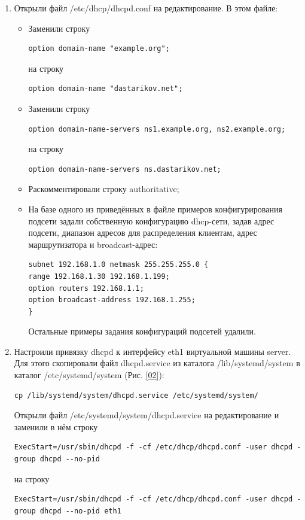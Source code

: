 \begin{enumerate}
\item Открыли файл /etc/dhcp/dhcpd.conf на редактирование. В этом файле:
    \begin{itemize}
\item Заменили строку
    \begin{verbatim}
option domain-name "example.org";
    \end{verbatim}
на строку
    \begin{verbatim}
option domain-name "dastarikov.net";
    \end{verbatim}
\item Заменили строку
    \begin{verbatim}
option domain-name-servers ns1.example.org, ns2.example.org;
    \end{verbatim}
на строку
    \begin{verbatim}
option domain-name-servers ns.dastarikov.net;
    \end{verbatim}
\item Раскомментировали строку authoritative;
\item На базе одного из приведённых в файле примеров конфигурирования подсети задали собственную конфигурацию dhcp-сети, задав адрес подсети, диапазон адресов для распределения клиентам, адрес маршрутизатора и broadcast-адрес:
    \begin{verbatim}
subnet 192.168.1.0 netmask 255.255.255.0 {
range 192.168.1.30 192.168.1.199;
option routers 192.168.1.1;
option broadcast-address 192.168.1.255;
}
    \end{verbatim}
Остальные примеры задания конфигураций подсетей удалили.
    \end{itemize}
\item Настроили привязку dhcpd к интерфейсу eth1 виртуальной машины server. Для этого скопировали файл dhcpd.service из каталога /lib/systemd/system в каталог /etc/systemd/system (Рис. \ref{02}):
    \begin{verbatim}
cp /lib/systemd/system/dhcpd.service /etc/systemd/system/
    \end{verbatim}
Открыли файл /etc/systemd/system/dhcpd.service на редактирование и заменили в нём строку
    \begin{verbatim}
ExecStart=/usr/sbin/dhcpd -f -cf /etc/dhcp/dhcpd.conf -user dhcpd -group dhcpd --no-pid
    \end{verbatim}
на строку
    \begin{verbatim}
ExecStart=/usr/sbin/dhcpd -f -cf /etc/dhcp/dhcpd.conf -user dhcpd -group dhcpd --no-pid eth1
    \end{verbatim}


\end{enumerate}
